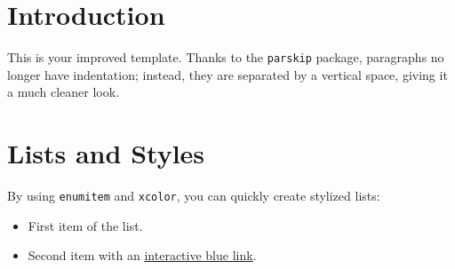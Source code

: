 \documentclass[11pt,a4paper]{article}
\begin{document}
\section*{Introduction}
This is your improved template. Thanks to the \texttt{parskip} package, paragraphs no longer have indentation; instead, they are separated by a vertical space, giving it a much cleaner look.

\section*{Lists and Styles}
By using \texttt{enumitem} and \texttt{xcolor}, you can quickly create stylized lists:
\begin{itemize}[leftmargin=*]
    \item First item of the list.
    \item Second item with an \href{https://en.wikipedia.org}{interactive blue link}.
\end{itemize}
\end{document}
